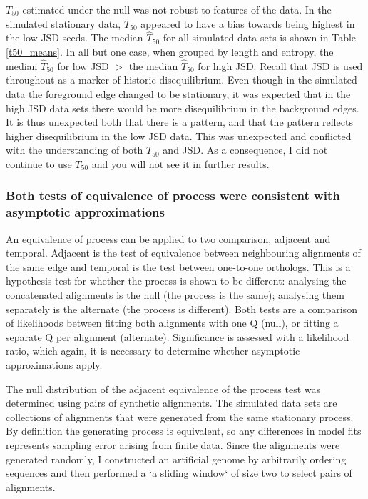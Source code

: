 

$T_{50}$ estimated under the null was not robust to features of the data. In the simulated stationary data, $T_{50}$ appeared to have a bias towards being highest in the low JSD seeds. The median $\hat T_{50}$ for all simulated data sets is shown in Table \ref{t50_means}. In all but one case, when grouped by length and entropy, the median $\hat T_{50}$ for low JSD $>$ the median $\hat T_{50}$ for high JSD. Recall that JSD is used throughout as a marker of historic disequilibrium. Even though in the simulated data the foreground edge changed to be stationary, it was expected that in the high JSD data sets there would be more disequilibrium in the background edges. It is thus unexpected both that there is a pattern, and that the pattern reflects higher disequilibrium in the low JSD data. This was unexpected and conflicted with the understanding of both $T_{50}$ and JSD.  As a consequence, I did not continue to use $T_{50}$ and you will not see it in further results.



\subsubsection*{Both tests of equivalence of process were consistent with asymptotic approximations}

An equivalence of process can be applied to two comparison, adjacent and temporal. Adjacent is the test of equivalence between neighbouring alignments of the same edge and temporal is the test between one-to-one orthologs. This is a hypothesis test for whether the process is shown to be different: analysing the concatenated alignments is the null (the process is the same); analysing them separately is the alternate (the process is different). Both tests are a comparison of likelihoods between fitting both alignments with one $\mathrm{Q}$ (null), or fitting a separate $\mathrm{Q}$ per alignment (alternate). Significance is assessed with a likelihood ratio, which again, it is necessary to determine whether asymptotic approximations apply. 

The null distribution of the adjacent equivalence of the process test was determined using pairs of synthetic alignments. The simulated data sets are collections of alignments that were generated from the same stationary process. By definition the generating process is equivalent, so any differences in model fits represents sampling error arising from finite data. Since the alignments were generated randomly, I constructed an artificial genome by arbitrarily ordering sequences and then performed a `a sliding window` of size two to select pairs of alignments.

